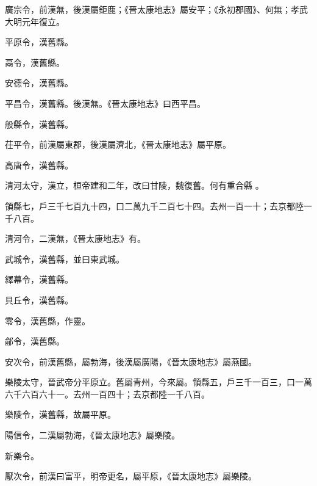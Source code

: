 \begin{pinyinscope}
 廣宗令，前漢無，後漢屬鉅鹿；《晉太康地志》屬安平；《永初郡國》、何無；孝武大明元年復立。



 平原令，漢舊縣。



 鬲令，漢舊縣。



 安德令，漢舊縣。



 平昌令，漢舊縣。後漢無。《晉太康地志》曰西平昌。



 般縣令，漢舊縣。



 茌平令，前漢屬東郡，後漢屬濟北，《晉太康地志》屬平原。



 高唐令，漢舊縣。


清河太守，漢立，桓帝建和二年，改曰甘陵，魏復舊。何有重合縣
 。



 領縣七，戶三千七百九十四，口二萬九千二百七十四。去州一百一十；去京都陸一千八百。



 清河令，二漢無，《晉太康地志》有。



 武城令，漢舊縣，並曰東武城。



 繹幕令，漢舊縣。



 貝丘令，漢舊縣。



 零令，漢舊縣，作靈。



 鄃令，漢舊縣。



 安次令，前漢舊縣，屬勃海，後漢屬廣陽，《晉太康地志》屬燕國。



 樂陵太守，晉武帝分平原立。舊屬青州，今來屬。領縣五，戶三千一百三，口一萬六千六百六十一。去州一百四十；去京都陸一千八百。



 樂陵令，漢舊縣，故屬平原。



 陽信令，二漢屬勃海，《晉太康地志》屬樂陵。


新樂令。



 厭次令，前漢曰富平，明帝更名，屬平原，《晉太康地志》屬樂陵。




\end{pinyinscope}
